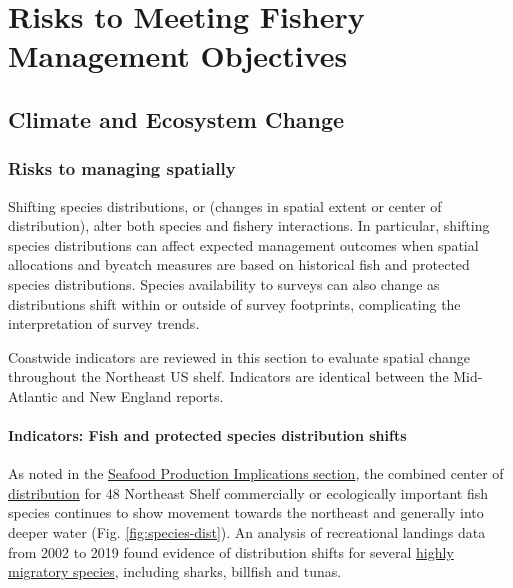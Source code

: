 \documentclass[
  10pt,
]{article}
\begin{document}
\section{Risks to Meeting Fishery Management Objectives}\label{risks-to-meeting-fishery-management-objectives}

\subsection{Climate and Ecosystem Change}\label{climate-and-ecosystem-change}

\subsubsection{Risks to managing spatially}\label{risks-to-managing-spatially}

Shifting species distributions, or (changes in spatial extent or center of distribution), alter both species and fishery interactions. In particular, shifting species distributions can affect expected management outcomes when spatial allocations and bycatch measures are based on historical fish and protected species distributions. Species availability to surveys can also change as distributions shift within or outside of survey footprints, complicating the interpretation of survey trends.

Coastwide indicators are reviewed in this section to evaluate spatial change throughout the Northeast US shelf. Indicators are identical between the Mid-Atlantic and New England reports.

\paragraph{Indicators: Fish and protected species distribution shifts}\label{indicators-fish-and-protected-species-distribution-shifts}

As noted in the \hyperref[implications]{Seafood Production Implications section}, the combined center of \href{https://noaa-edab.github.io/catalog/species_dist.html}{distribution} for 48 Northeast Shelf commercially or ecologically important fish species continues to show movement towards the northeast and generally into deeper water (Fig. \ref{fig:species-dist}). An analysis of recreational landings data from 2002 to 2019 found evidence of distribution shifts for several \href{https://noaa-edab.github.io/catalog/species_dist.html}{highly migratory species}, including sharks, billfish and tunas.
\end{document}
